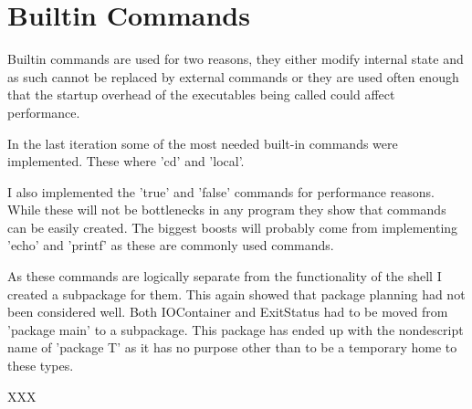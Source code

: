 \section{Builtin Commands}
\label{sec:builtins}
Builtin commands are used for two reasons, they either modify internal state and as such cannot be replaced by external commands or they are used often enough that the startup overhead of the executables being called could affect performance.

In the last iteration some of the most needed built-in commands were implemented.
These where 'cd' and 'local'.

I also implemented the 'true' and 'false' commands for performance reasons.
While these will not be bottlenecks in any program they show that commands can be easily created.
The biggest boosts will probably come from implementing 'echo' and 'printf' as these are commonly used commands.

As these commands are logically separate from the functionality of the shell I created a subpackage for them.
This again showed that package planning had not been considered well.
Both IOContainer and ExitStatus had to be moved from 'package main' to a subpackage.
This package has ended up with the nondescript name of 'package T' as it has no purpose other than to be a temporary home to these types.

XXX
